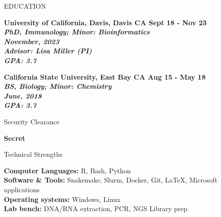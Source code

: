 \documentclass{resume} %
\begin{document}

\begin{rSection}{EDUCATION}

\bf University of California, Davis, Davis CA
\hfill Sept 18 - Nov 23\\
\sl PhD, Immunology; Minor: Bioinformatics \\
\textit November, 2023 \\
\textit{Advisor:} Lisa Miller (PI) \\
\hfill GPA: 3.7

\bf California State University, East Bay CA 
\hfill Aug 15 - May 18\\
\sl BS, Biology; Minor: Chemistry \\
\textit June, 2018 \\
\hfill GPA: 3.7

\end{rSection}


\begin{rSection}{Security Clearance}

\bf Secret

\end{rSection}


\begin{rSection}{Technical Strengths}

\textbf{Computer Languages:} R, Bash, Python \\
\textbf{Software \& Tools:} Snakemake, Slurm, Docker, Git, LaTeX, Microsoft applications \\
\textbf{Operating systems:} Windows, Linux \\
\textbf{Lab bench:} DNA/RNA extraction, PCR, NGS Library prep \\

\end{rSection}

\end{document}
